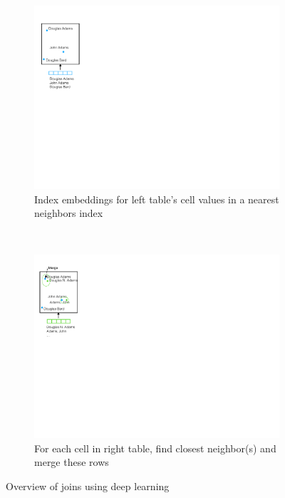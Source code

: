 \begin{figure}[htb]
    ~ 
    \begin{subfigure}[t]{0.24\linewidth}
        \centering 
        \includegraphics[width=.9\linewidth]{join3}
        \caption{Index embeddings for left table's cell values in a nearest neighbors index}
        \label{join3}
    \end{subfigure}
    ~ 
    \begin{subfigure}[t]{0.24\linewidth}
        \centering 
        \includegraphics[width=.9\linewidth]{join4}
        \caption{For each cell in right table, find closest neighbor(s) and merge these rows}
        \label{join4}
    \end{subfigure}
    \caption{Overview of joins using deep learning}
    \label{join_fig}
\end{figure}


